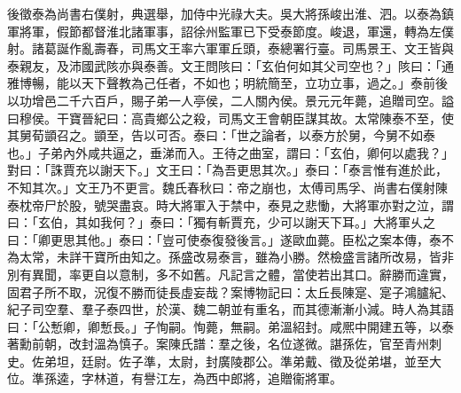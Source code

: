 \begin{pinyinscope}
後徵泰為尚書右僕射，典選舉，加侍中光祿大夫。吳大將孫峻出淮、泗。以泰為鎮軍將軍，假節都督淮北諸軍事，詔徐州監軍已下受泰節度。峻退，軍還，轉為左僕射。諸葛誕作亂壽春，司馬文王率六軍軍丘頭，泰總署行臺。司馬景王、文王皆與泰親友，及沛國武陔亦與泰善。文王問陔曰：「玄伯何如其父司空也？」陔曰：「通雅博暢，能以天下聲教為己任者，不如也；明統簡至，立功立事，過之。」泰前後以功增邑二千六百戶，賜子弟一人亭侯，二人關內侯。景元元年薨，追贈司空。謚曰穆侯。干寶晉紀曰：高貴鄉公之殺，司馬文王會朝臣謀其故。太常陳泰不至，使其舅荀顗召之。顗至，告以可否。泰曰：「世之論者，以泰方於舅，今舅不如泰也。」子弟內外咸共逼之，垂涕而入。王待之曲室，謂曰：「玄伯，卿何以處我？」對曰：「誅賈充以謝天下。」文王曰：「為吾更思其次。」泰曰：「泰言惟有進於此，不知其次。」文王乃不更言。魏氏春秋曰：帝之崩也，太傅司馬孚、尚書右僕射陳泰枕帝尸於股，號哭盡哀。時大將軍入于禁中，泰見之悲慟，大將軍亦對之泣，謂曰：「玄伯，其如我何？」泰曰：「獨有斬賈充，少可以謝天下耳。」大將軍乆之曰：「卿更思其他。」泰曰：「豈可使泰復發後言。」遂歐血薨。臣松之案本傳，泰不為太常，未詳干寶所由知之。孫盛改易泰言，雖為小勝。然檢盛言諸所改易，皆非別有異聞，率更自以意制，多不如舊。凡記言之體，當使若出其口。辭勝而違實，固君子所不取，況復不勝而徒長虛妄哉？案博物記曰：太丘長陳寔、寔子鴻臚紀、紀子司空羣、羣子泰四世，於漢、魏二朝並有重名，而其德漸漸小減。時人為其語曰：「公慙卿，卿慙長。」子恂嗣。恂薨，無嗣。弟溫紹封。咸熈中開建五等，以泰著勳前朝，改封溫為慎子。案陳氏譜：羣之後，名位遂微。諶孫佐，官至青州刺史。佐弟坦，廷尉。佐子準，太尉，封廣陵郡公。準弟戴、徵及從弟堪，並至大位。準孫逵，字林道，有譽江左，為西中郎將，追贈衞將軍。


\end{pinyinscope}